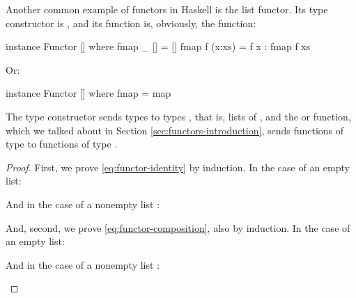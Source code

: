 \begin{example}
  \label{ex:functor-list-haskell}


  Another common example of functors in Haskell is the list functor.
  Its type constructor is \texthaskell{[]}, and its 
  function is, obviously, the  function:
  \begin{codehaskell}
instance Functor [] where
  fmap _ []     = []
  fmap f (x:xs) = f x : fmap f xs
  \end{codehaskell}
  Or:
  \begin{codehaskell}
instance Functor [] where
  fmap = map
  \end{codehaskell}
  The \texthaskell{[]} type constructor sends types  to
  types \texthaskell{[a]}, that is, lists of , and the
   or  function, which we talked
  about in Section \ref{sec:functors-introduction}, sends functions of
  type  to functions of type \texthaskell{[a] ->
    [b]}.

  \begin{proof}

    First, we prove \eqref{eq:functor-identity} by induction. In the
    case of an empty list:
    \begin{steps}
      \steph{[]}
    \end{steps}
    And in the case of a nonempty list :
    \begin{steps}
        \eqbyihh{}
    \end{steps}
    And, second, we prove \eqref{eq:functor-composition}, also by
    induction. In the case of an empty list:
    \begin{steps}
      \steph{[]}
    \end{steps}
    And in the case of a nonempty list :
    \begin{steps}
        \eqbyihh{}
    \end{steps}

  \end{proof}

\end{example}

